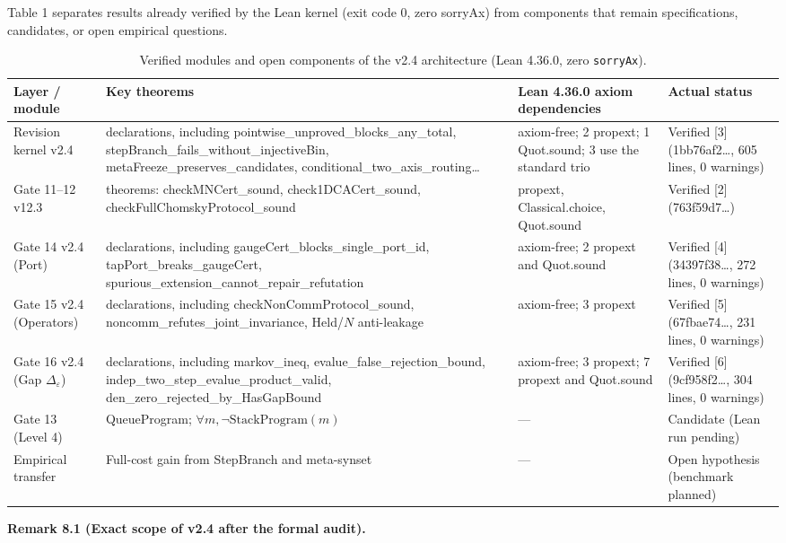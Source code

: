 \documentclass[11pt,a4paper]{article}
\begin{document}
Table 1 separates results already verified by the Lean kernel (exit code 0, zero sorryAx) from components that remain specifications, candidates, or open empirical questions.

\begin{table}[htbp]
\caption{Verified modules and open components of the v2.4 architecture (Lean 4.36.0, zero \texttt{sorryAx}).}
\small
\setlength{\tabcolsep}{3pt}
\begin{tabularx}{\linewidth}{@{}>{\raggedright\arraybackslash}p{.16\linewidth}>{\raggedright\arraybackslash}X>{\raggedright\arraybackslash}p{.24\linewidth}>{\raggedright\arraybackslash}p{.24\linewidth}@{}}
\toprule

Layer / module & Key theorems & Lean 4.36.0 axiom dependencies & Actual status \\
\midrule
Revision kernel v2.4 & 15 declarations, including pointwise\_\allowbreak unproved\_\allowbreak blocks\_\allowbreak any\_\allowbreak total, stepBranch\_\allowbreak fails\_\allowbreak without\_\allowbreak injectiveBin, metaFreeze\_\allowbreak preserves\_\allowbreak candidates, conditional\_\allowbreak two\_\allowbreak axis\_\allowbreak routing… & 9 axiom-free; 2 propext; 1 Quot.sound; 3 use the standard trio & Verified [3] (1bb76af2…, 605 lines, 0 warnings) \\
Gate 11–12 v12.3 & 12 theorems: checkMNCert\_\allowbreak sound, check1DCACert\_\allowbreak sound, checkFullChomskyProtocol\_\allowbreak sound & propext, Classical.choice, Quot.sound & Verified [2] (763f59d7…) \\
Gate 14 v2.4 (Port) & 10 declarations, including gaugeCert\_\allowbreak blocks\_\allowbreak single\_\allowbreak port\_\allowbreak id, tapPort\_\allowbreak breaks\_\allowbreak gaugeCert, spurious\_\allowbreak extension\_\allowbreak cannot\_\allowbreak repair\_\allowbreak refutation & 8 axiom-free; 2 propext and Quot.sound & Verified [4] (34397f38…, 272 lines, 0 warnings) \\
Gate 15 v2.4 (Operators) & 8 declarations, including checkNonCommProtocol\_\allowbreak sound, noncomm\_\allowbreak refutes\_\allowbreak joint\_\allowbreak invariance, Held/\(N\) anti-leakage & 5 axiom-free; 3 propext & Verified [5] (67fbae74…, 231 lines, 0 warnings) \\
Gate 16 v2.4 (Gap \(\Delta_\varepsilon\)) & 11 declarations, including markov\_\allowbreak ineq, evalue\_\allowbreak false\_\allowbreak rejection\_\allowbreak bound, indep\_\allowbreak two\_\allowbreak step\_\allowbreak evalue\_\allowbreak product\_\allowbreak valid, den\_\allowbreak zero\_\allowbreak rejected\_\allowbreak by\_\allowbreak HasGapBound & 1 axiom-free; 3 propext; 7 propext and Quot.sound & Verified [6] (9cf958f2…, 304 lines, 0 warnings) \\
Gate 13 (Level 4) & QueueProgram; \(\forall m,\neg\mathrm{StackProgram}(m)\) & — & Candidate (Lean run pending) \\
Empirical transfer & Full-cost gain from StepBranch and meta-synset & — & Open hypothesis (benchmark planned) \\
\bottomrule
\end{tabularx}
\end{table}
\textbf{Remark 8.1 (Exact scope of v2.4 after the formal audit).}
\end{document}

